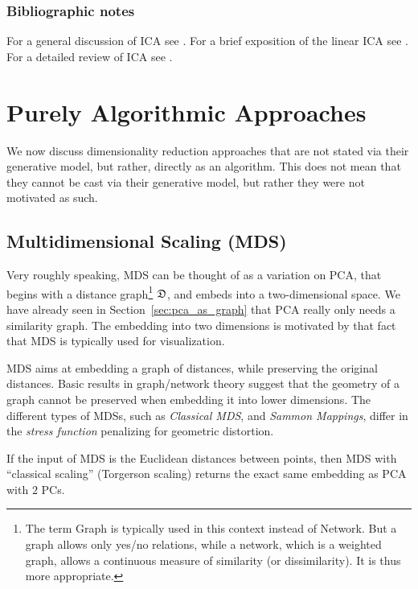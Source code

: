 \documentclass[12pt,a4paper]{article}
\begin{document}
\subsubsection{Bibliographic notes}
For a general discussion of ICA see \cite{jolliffe2002principal}.
For a brief exposition of the linear ICA see \cite{friedman2001elements}. 
For a detailed review of ICA see \cite{hyvarinen2000independent}. 








\section{Purely Algorithmic Approaches}

We now discuss dimensionality reduction approaches that are not stated via their generative model, but rather, directly as an algorithm.
This does not mean that they cannot be cast via their generative model, but rather they were not motivated as such.



\subsection{Multidimensional Scaling (MDS)}
\label{sec:mds}

Very roughly speaking, MDS can be thought of as a variation on PCA, that begins with a distance graph\footnote{The term Graph is typically used in this context instead of Network. But a graph allows only yes/no relations, while a network, which is a weighted graph, allows a continuous measure of similarity (or dissimilarity). It is thus more appropriate.} $\mathfrak{D}$, and embeds into a two-dimensional space.
We have already seen in Section~\ref{sec:pca_as_graph} that PCA really only needs a similarity graph. 
The embedding into two dimensions is motivated by that fact that MDS is typically used for visualization. 

MDS aims at embedding a graph of distances, while preserving the original distances.
Basic results in graph/network theory suggest that the geometry of a graph cannot be preserved when embedding it into lower dimensions. 
The different types of MDSs, such as \emph{Classical MDS}, and \emph{Sammon Mappings}, differ in the \emph{stress function} penalizing for geometric distortion.

\begin{remark}
	If the input of MDS is the Euclidean distances between points, then MDS with ``classical scaling'' (\aka Torgerson scaling) returns the exact same embedding as PCA with $2$ PCs.
\end{remark}
\end{document}
